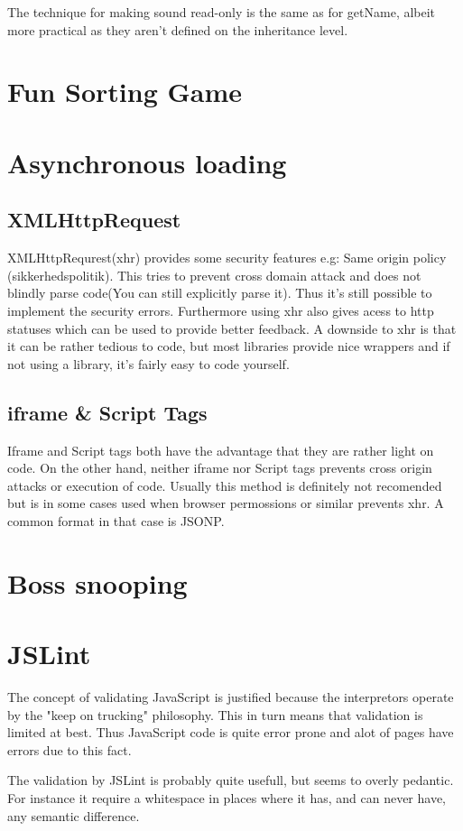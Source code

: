 \documentclass[a4paper,10pt]{article}
\begin{document}
The technique for making sound read-only is the same as for getName,
albeit more practical as they aren't defined on the inheritance level.

\section*{Fun Sorting Game}


\section*{Asynchronous loading}
\subsection*{XMLHttpRequest}
  XMLHttpRequrest(xhr) provides some security features e.g:
Same origin policy (sikkerhedspolitik). This tries to prevent cross domain attack and does not blindly parse code(You can still explicitly parse it). Thus it's still possible to implement the security errors.
Furthermore using xhr also gives acess to http statuses which can be used to provide better feedback.
A downside to xhr is that it can be rather tedious to code, but most libraries provide nice wrappers and if not using a library, it's fairly easy to code yourself.

\subsection*{iframe \& Script Tags}
Iframe and Script tags both have the advantage that they are rather light on code. On the other hand, neither iframe nor Script tags prevents cross origin attacks or execution of code. Usually this method is definitely not recomended but is in some cases used when browser permossions or similar prevents xhr. A common format in that case is JSONP.

\section*{Boss snooping}


\section*{JSLint}
The concept of validating JavaScript is justified because the interpretors operate by the "keep on trucking" philosophy. This in turn means that validation is limited at best. Thus JavaScript code is quite error prone and alot of pages have errors due to this fact.

The validation by JSLint is probably quite usefull, but seems to overly pedantic. For instance it require a whitespace in places where it has, and can never have, any semantic difference. 
\end{document}
